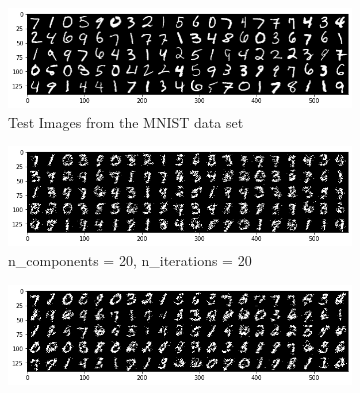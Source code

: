 \begin{figure}[ht]
	\begin{subfigure}[b]{0.33\textwidth}
		\centering
		\captionsetup{ width=0.8\linewidth, format = hang}
		\includegraphics[height = 0.5\textwidth, width = 1\textwidth]{Exercise4/Report/test_image}
		\caption{Test Images from the MNIST data set}\label{fig:test}
	\end{subfigure}%
	\begin{subfigure}[b]{0.33\textwidth}
		\centering
		\captionsetup{width=0.8\linewidth, format = hang}
		\includegraphics[height = 0.5\textwidth, width = 1\textwidth]{Exercise4/Report/rbm_ncomp_20_itr_20}
		\caption{n\_components = 20, n\_iterations = 20}\label{fig:rbm_ncomp_20_itr_20}
	\end{subfigure}%
	\begin{subfigure}[b]{0.33\textwidth}
		\centering
		\captionsetup{width=0.8\linewidth, format = hang}
		\includegraphics[height = 0.5\textwidth,width = 1\textwidth]{Exercise4/Report/rbm_ncomp_30_itr_30}

\end{subfigure}
\end{figure}

